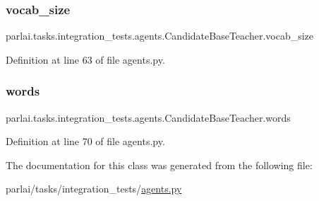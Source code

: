 \subsubsection{\texorpdfstring{vocab\+\_\+size}{vocab\_size}}
{\footnotesize\ttfamily parlai.\+tasks.\+integration\+\_\+tests.\+agents.\+Candidate\+Base\+Teacher.\+vocab\+\_\+size\hspace{0.3cm}{\ttfamily [static]}}



Definition at line 63 of file agents.\+py.

\mbox{\label{classparlai_1_1tasks_1_1integration__tests_1_1agents_1_1CandidateBaseTeacher_adacce3fdb348bc21cb421acf25939a37}} 
\subsubsection{\texorpdfstring{words}{words}}
{\footnotesize\ttfamily parlai.\+tasks.\+integration\+\_\+tests.\+agents.\+Candidate\+Base\+Teacher.\+words\hspace{0.3cm}{\ttfamily [static]}}



Definition at line 70 of file agents.\+py.



The documentation for this class was generated from the following file\+:\begin{DoxyCompactItemize}
\item 
parlai/tasks/integration\+\_\+tests/\hyperlink{parlai_2tasks_2integration__tests_2agents_8py}{agents.\+py}\end{DoxyCompactItemize}
